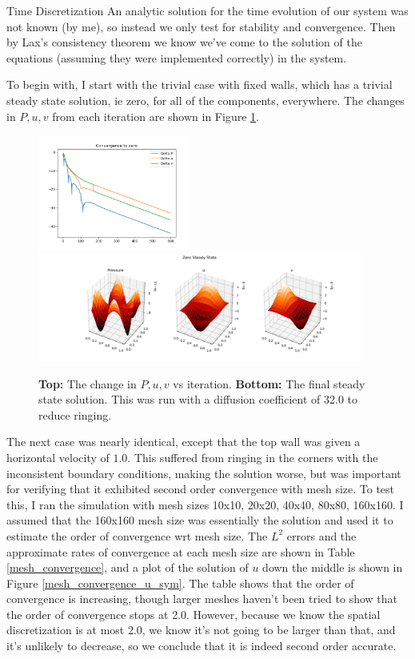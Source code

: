 \documentclass{article}
\begin{document}
\begin{section}{Time Discretization}
An analytic solution for the time evolution of our system was not known (by me),
so instead we only test for stability and convergence.
Then by Lax's consistency theorem we know we've come to the solution of the equations
(assuming they were implemented correctly) in the system.

To begin with, I start with the trivial case with fixed walls,
which has a trivial steady state solution, ie zero, for all of the components, everywhere.
The changes in $P, u, v$ from each iteration are shown in Figure \ref{trivial}.

\begin{figure}[ht]
  \includegraphics[width=0.45\textwidth]{trivial_sol/convergence.png}\\
  \includegraphics[width=0.95\textwidth]{trivial_sol/steadystate.png}
  \label{trivial}
  \caption{{\bf Top:} The change in $P, u, v$ vs iteration.
    {\bf Bottom:} The final steady state solution.
    This was run with a diffusion coefficient of 32.0 to reduce ringing.}
\end{figure}

The next case was nearly identical, except that the top wall was given a horizontal velocity of $1.0$.
This suffered from ringing in the corners with the inconsistent boundary conditions,
making the solution worse, but was important for verifying that it exhibited second order convergence with mesh size.
To test this, I ran the simulation with mesh sizes 10x10, 20x20, 40x40, 80x80, 160x160.
I assumed that the 160x160 mesh size was essentially the solution and used it to estimate the
order of convergence wrt mesh size.
The $L^2$ errors and the approximate rates of convergence at each mesh size are shown in Table \ref{mesh_convergence},
and a plot of the solution of $u$ down the middle is shown in Figure \ref{mesh_convergence_u_sym}.
The table shows that the order of convergence is increasing,
though larger meshes haven't been tried to show that the order of convergence stops at 2.0.
However, because we know the spatial discretization is at most 2.0,
we know it's not going to be larger than that, and it's unlikely to decrease,
so we conclude that it is indeed second order accurate.


\end{section}
\end{document}

